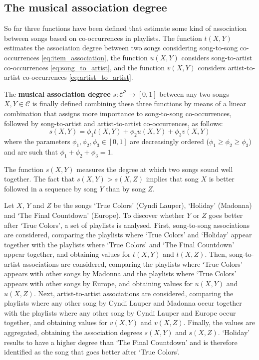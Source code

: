 \subsection{The musical association degree} %
\label{sub:making_it_all_together}

So far three functions have been defined that estimate some kind of association between songs based on co-occurrences in playlists.
The function $t(X,Y)$ estimates the association degree between two songs considering song-to-song co-occurrences \eqref{eq:item_association}, the function $u(X,Y)$ considers song-to-artist co-occurrences \eqref{eq:song_to_artist}, and the function $v(X,Y)$ considers artist-to-artist co-occurrences \eqref{eq:artist_to_artist}.

The \textbf{musical association degree} $s: \mathcal{C}^2 \to [0,1]$ between any two songs $X,Y \in \mathcal{C}$ is finally defined combining these three functions by means of a linear combination that assigns more importance to song-to-song co-occurrences, followed by song-to-artist and artist-to-artist co-occurrences, as follows:
\begin{equation}\label{eq:final_degree}
        s(X,Y) = \phi_1 t(X,Y) + \phi_2 u(X,Y) + \phi_3 v(X,Y)
\end{equation}
where the parameters  $\phi_1, \phi_2, \phi_3 \in [0,1]$ are decreasingly ordered ($\phi_1 \geqslant \phi_2 \geqslant \phi_3$) and are such that $\phi_1 + \phi_2 + \phi_3 = 1$.

The function $s(X,Y)$ measures the degree at which two songs sound well together. 
The fact that $s(X,Y) > s(X,Z)$ implies that song $X$ is better followed in a sequence by song $Y$ than by song $Z$.

\begin{example}\label{ex:smoothness}
Let $X$, $Y$ and $Z$ be the songs `True Colors' (Cyndi Lauper), `Holiday' (Madonna) and `The Final Countdown' (Europe). 
To discover whether $Y$ or $Z$ goes better after `True Colors', a set of playlists is analysed.
First, song-to-song associations are considered, comparing the playlists where `True Colors' and `Holiday' appear together with the playlists where `True Colors' and `The Final Countdown' appear together, and obtaining values for $t(X,Y)$ and $t(X,Z)$.
Then, song-to-artist associations are considered, comparing the playlists where `True Colors'
appears with other songs by Madonna and the playlists where `True Colors' appears with other songs by Europe, and obtaining values for $u(X,Y)$ and $u(X,Z)$.
Next, artist-to-artist associations are considered, comparing the playlists where any other song by Cyndi Lauper and Madonna occur together with the playlists where any other song by Cyndi Lauper and Europe occur together, and obtaining values for $v(X,Y)$ and $v(X,Z)$.
Finally, the values are aggregated, obtaining the association degrees $s(X,Y)$ and $s(X,Z)$. `Holiday' results to have a higher degree than `The Final Countdown' and is therefore identified as the song that goes better after `True Colors'.
\end{example}
  
